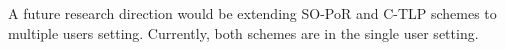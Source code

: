 \begin{remark} A future research direction would be extending SO-PoR and C-TLP schemes to multiple users setting. Currently, both schemes are in the single user setting. 
\end{remark}



